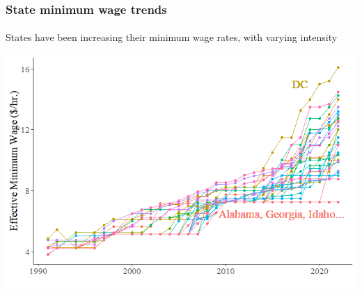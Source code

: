 \begin{frame}

    \label{min_wage_plot_allstates}
    
    \frametitle{State minimum wage trends} %
    \framesubtitle{}  %
    \rmfamily %
    
    \begin{wideitemize}
        \item States have been increasing their \textcolor{fblu}{minimum wage rates}, with varying intensity
    \end{wideitemize}

    \begin{center}
        \includegraphics[scale=0.5]{min_wage_plot.png}
    \end{center}
    
    \hyperlink{main_idea}{}
    
\end{frame}

